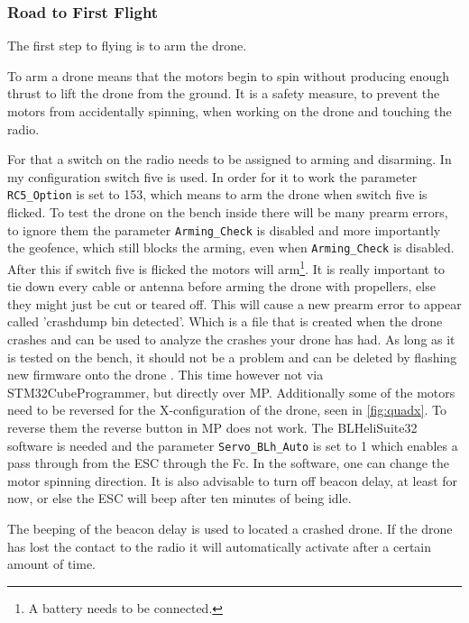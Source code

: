 \documentclass[svgnames]{article}
\begin{document}
	\subsubsection{Road to First Flight}
	The first step to flying is to arm the drone.
	\begin{Explanation}[to arm]
		\item To arm a drone means that the motors begin to spin without producing enough thrust to lift the drone from the ground. It is a safety measure, to prevent the motors from accidentally spinning, when working on the drone and touching the radio.
	\end{Explanation}
	For that a switch on the radio needs to be assigned to arming and disarming. In my configuration  switch five is used. In order for it to work the parameter \lstinline|RC5_Option| is set to 153, which means to arm the drone when switch five is flicked. To test the drone on the bench inside there will be many prearm errors, to ignore them the parameter \lstinline|Arming_Check| is disabled and more importantly the geofence, which still blocks the arming, even when \lstinline|Arming_Check| is disabled. After this if switch five is flicked the motors will arm\footnote{A battery needs to be connected.}. It is really important to tie down every cable or antenna before arming the drone with propellers, else they might just be cut or teared off. This will cause a new prearm error to appear called 'crashdump bin detected'. Which is a file that is created when the drone crashes and can be used to analyze the crashes your drone has had. As long as it is tested on the bench, it should not be a problem and can be deleted by flashing new firmware onto the drone \cite{blogcrashdump}. This time however not via STM32CubeProgrammer, but directly over \gls{MP}. Additionally some of the motors need to be reversed for the X-configuration of the drone, seen in \cref{fig:quadx}. To reverse them the reverse button in \gls{MP} does not work. The BLHeliSuite32 software is needed and the parameter \lstinline|Servo_BLh_Auto| is set to 1 which enables a pass through from the \gls{ESC} through the \gls{Fc}. In the software, one can change the motor spinning direction. It is also advisable to turn off beacon delay, at least for now, or else the \gls{ESC} will beep after ten minutes of being idle.
	\begin{Explanation}
		\item The beeping of the beacon delay is used to located a crashed drone. If the drone has lost the contact to the radio it will automatically activate after a certain amount of time.
	\end{Explanation}
	
\end{document}

